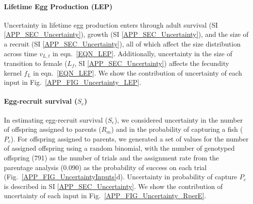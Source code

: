 \documentclass[12pt, oneside]{article}   	%
\begin{document}
\paragraph*{Lifetime Egg Production (LEP)} %

Uncertainty in lifetime egg production enters through adult survival (SI \ref{APP_SEC_Uncertainty}), growth (SI \ref{APP_SEC_Uncertainty}), and the size of a recruit (SI \ref{APP_SEC_Uncertainty}), all of which affect the size distribution across time $v_{L,t}$ in eqn.\ \ref{EQN_LEP}. Additionally, uncertainty in the size of transition to female ($L_f$, SI \ref{APP_SEC_Uncertainty}) affects the fecundity kernel $f_L$ in eqn.\ \ref{EQN_LEP}. We show the contribution of uncertainty of each input in Fig.\ \ref{APP_FIG_Uncertainty_LEP}.

\paragraph*{Egg-recruit survival ($S_e$)} %

In estimating egg-recruit survival ($S_e$), we considered uncertainty in the number of offspring assigned to parents ($R_m$) and in the probability of capturing a fish ($P_c$). For offspring assigned to parents, we generated a set of values for the number of assigned offspring using a random binomial, with the number of genotyped offspring (791) as the number of trials and the assignment rate from the parentage analysis (0.090) as the probability of success on each trial \citep{catalanoInPrepconnectivity} (Fig.\ \ref{APP_FIG_UncertaintyInputs}d). Uncertainty in probability of capture $P_c$ is described in SI \ref{APP_SEC_Uncertainty}. We show the contribution of uncertainty of each input in Fig.\ \ref{APP_FIG_Uncertainty_RperE}.


\end{document}
